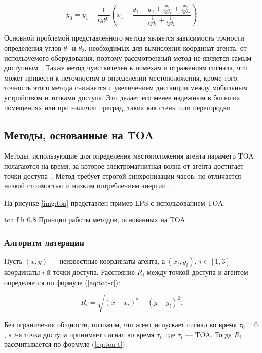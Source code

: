 \begin{equation}
    y_3 = y_1 - \frac{1}{tg\theta_1}\left(x_1 - \frac{y_1 - y_2 + \frac{x_1}{tg\theta_1} + \frac{x_2}{tg\theta_2}}{\frac{1}{tg\theta_1} + \frac{1}{tg\theta_2}}\right)
    \label{eq:aoa-y}
\end{equation}

Основной проблемой представленного метода является зависимость точности определения углов $\theta_1$ и $\theta_2$, необходимых для вычисления координат агента, от используемого оборудования, поэтому рассмотренный метод не является самым доступным~\cite{aoa-modern}. Также метод чувствителен к помехам и отражениям сигнала, что может привести к неточностям в определении местоположения, кроме того, точность этого метода снижается с увеличением дистанции между мобильным устройством и точками доступа. Это делает его менее надежным в больших помещениях или при наличии преград, таких как стены или перегородки~\cite{aoa}.

\clearpage

\subsection{Методы, основанные на TOA}

Методы, использующие для определения местоположения агента параметр TOA полагаются на время, за которое электромагнитная волна от агента достигает точки доступа~\cite{trends}. Метод требует строгой синхронизации часов, но отличается низкой стоимостью и низким потреблением энергии~\cite{toa}.

На рисунке \ref{img:toa} представлен пример LPS с использованием TOA.

    {toa}
    {f}
    {h}
    {0.8\linewidth}
    {Принцип работы методов, основанных на TOA}

\subsubsection{Алгоритм латерации}

Пусть $(x, y)$ --- неизвестные координаты агента, а $(x_i, y_i),~i \in [1, 3]$ --- координаты $i$-й точки доступа. Расстояние $R_i$ между точкой доступа и агентом определяется по формуле (\ref{eq:toa-r}):

\begin{equation}
    R_i = \sqrt{(x - x_i)^2 + (y - y_i)^2}.
    \label{eq:toa-r}
\end{equation}

Без ограничения общности, положим, что агент испускает сигнал во время $\tau_0 = 0$, а $i$-я точка доступа принимает сигнал во время $\tau_i$, где $\tau_i$ --- TOA. Тогда $R_i$ рассчитывается по формуле (\ref{eq:toa-t}):

